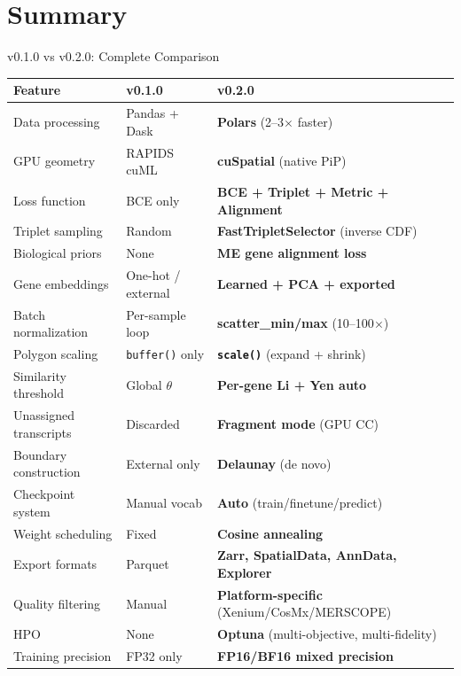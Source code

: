 \documentclass[aspectratio=169,10pt]{beamer}
\begin{document}
\section{Summary}

\begin{frame}{v0.1.0 vs v0.2.0: Complete Comparison}

\begin{center}
\renewcommand{\arraystretch}{1.1}
{\scriptsize
\begin{tabular}{@{}l l l@{}}
\toprule
\textbf{Feature} & \textbf{v0.1.0} & \textbf{v0.2.0} \\
\midrule
\rowcolor{lightgray} Data processing & Pandas + Dask & \textbf{Polars} (2--3$\times$ faster) \\
GPU geometry & RAPIDS cuML & \textbf{cuSpatial} (native PiP) \\
\rowcolor{lightgray} Loss function & BCE only & \textbf{BCE + Triplet + Metric + Alignment} \\
Triplet sampling & Random & \textbf{FastTripletSelector} (inverse CDF) \\
\rowcolor{lightgray} Biological priors & None & \textbf{ME gene alignment loss} \\
Gene embeddings & One-hot / external & \textbf{Learned + PCA + exported} \\
\rowcolor{lightgray} Batch normalization & Per-sample loop & \textbf{scatter\_min/max} (10--100$\times$) \\
Polygon scaling & \texttt{buffer()} only & \textbf{\texttt{scale()}} (expand + shrink) \\
\rowcolor{lightgray} Similarity threshold & Global $\theta$ & \textbf{Per-gene Li + Yen auto} \\
Unassigned transcripts & Discarded & \textbf{Fragment mode} (GPU CC) \\
\rowcolor{lightgray} Boundary construction & External only & \textbf{Delaunay} (de novo) \\
Checkpoint system & Manual vocab & \textbf{Auto} (train/finetune/predict) \\
\rowcolor{lightgray} Weight scheduling & Fixed & \textbf{Cosine annealing} \\
Export formats & Parquet & \textbf{Zarr, SpatialData, AnnData, Explorer} \\
\rowcolor{lightgray} Quality filtering & Manual & \textbf{Platform-specific} (Xenium/CosMx/MERSCOPE) \\
HPO & None & \textbf{Optuna} (multi-objective, multi-fidelity) \\
\rowcolor{lightgray} Training precision & FP32 only & \textbf{FP16/BF16 mixed precision} \\
\bottomrule
\end{tabular}
}
\end{center}
\end{frame}
\end{document}
